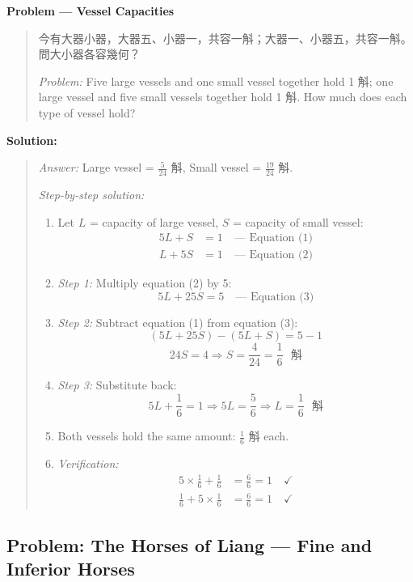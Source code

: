 \documentclass[11pt,a4paper]{article}
\newcommand{\zh}[1]{{#1}}
\newenvironment{chproblem}[1][]{%
  \par\medskip\noindent\textbf{\textcolor{sectioncolor}{#1}}\par\nopagebreak
  \begin{quote}\small
}{%
  \end{quote}\medskip
}
\newenvironment{chsolution}{%
  \par\medskip\noindent\textbf{\textcolor{notecolor}{Solution:}}\par\nopagebreak
  \begin{quote}\small
}{%
  \end{quote}\medskip
}
\newenvironment{stepbystep}{%
  \par\smallskip\noindent\textit{Step-by-step solution:}\par\nopagebreak
  \begin{enumerate}[leftmargin=2em,label=\textbf{Step \arabic*:},ref=\arabic*]
}{%
  \end{enumerate}\medskip
}
\begin{document}
\begin{chproblem}[Problem --- Vessel Capacities]
\zh{今有大器小器，大器五、小器一，共容一斛；大器一、小器五，共容一斛。問大小器各容幾何？}

\medskip
\textit{Problem:} Five large vessels and one small vessel together hold 1
\zh{斛}; one large vessel and five small vessels together hold 1 \zh{斛}. How
much does each type of vessel hold?
\end{chproblem}

\begin{chsolution}
\textit{Answer:} Large vessel = $\frac{5}{24}$ \zh{斛}, Small vessel =
$\frac{19}{24}$ \zh{斛}.

\begin{stepbystep}
\item Let $L$ = capacity of large vessel, $S$ = capacity of small vessel:
\begin{align*}
5L + S &= 1 \quad \text{--- Equation (1)} \\
L + 5S &= 1 \quad \text{--- Equation (2)}
\end{align*}

\item \textit{Step 1:} Multiply equation (2) by 5:
\[
5L + 25S = 5 \quad \text{--- Equation (3)}
\]

\item \textit{Step 2:} Subtract equation (1) from equation (3):
\[
(5L + 25S) - (5L + S) = 5 - 1
\]
\[
24S = 4 \Rightarrow S = \frac{4}{24} = \frac{1}{6} \text{ \zh{斛}}
\]

\item \textit{Step 3:} Substitute back:
\[
5L + \frac{1}{6} = 1 \Rightarrow 5L = \frac{5}{6} \Rightarrow L = \frac{1}{6} \text{ \zh{斛}}
\]

\item Both vessels hold the same amount: $\frac{1}{6}$ \zh{斛} each.

\item \textit{Verification:}
\begin{align*}
5 \times \frac{1}{6} + \frac{1}{6} &= \frac{6}{6} = 1 \quad \checkmark \\
\frac{1}{6} + 5 \times \frac{1}{6} &= \frac{6}{6} = 1 \quad \checkmark
\end{align*}
\end{stepbystep}
\end{chsolution}

\subsection{Problem: The Horses of Liang --- Fine and Inferior Horses}
\end{document}

